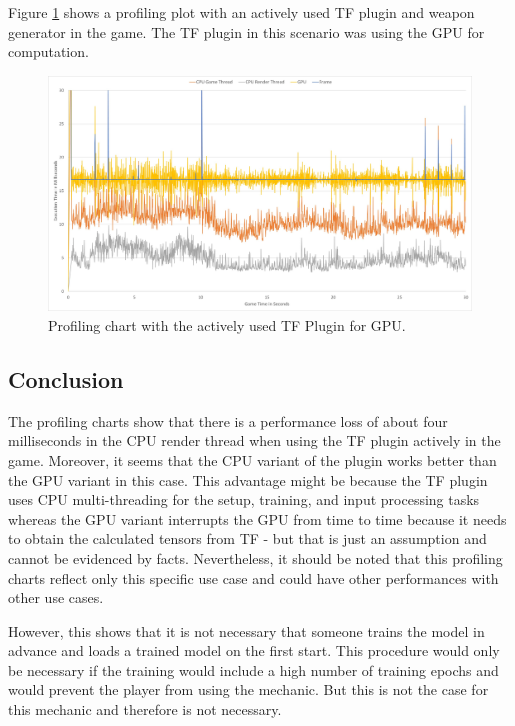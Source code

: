 \documentclass[MGS,Master,english]{twbook}%
\begin{document}
Figure \ref{scenario::profiling_GPU} shows a profiling plot with an actively used \ac{TF} plugin and weapon generator in the game. The \ac{TF} plugin in this scenario was using the \ac{GPU} for computation.
\begin{figure}[!ht]
	\centering
	\includegraphics[width=1.0\linewidth]{PICs/Profiling/tf_gpu}
	\caption{Profiling chart with the actively used \ac{TF} Plugin for \ac{GPU}.} \label{scenario::profiling_GPU}
\end{figure}

\subsection{Conclusion}
The profiling charts show that there is a performance loss of about four milliseconds in the \ac{CPU} render thread when using the \ac{TF} plugin actively in the game. Moreover, it seems that the \ac{CPU} variant of the plugin works better than the \ac{GPU} variant in this case. This advantage might be because the \ac{TF} plugin uses \ac{CPU} multi-threading for the setup, training, and input processing tasks whereas the \ac{GPU} variant interrupts the \ac{GPU} from time to time because it needs to obtain the calculated tensors from \ac{TF} - but that is just an assumption and cannot be evidenced by facts. Nevertheless, it should be noted that this profiling charts reflect only this specific use case and could have other performances with other use cases. 

However, this shows that it is not necessary that someone trains the model in advance and loads a trained model on the first start. This procedure would only be necessary if the training would include a high number of training epochs and would prevent the player from using the mechanic. But this is not the case for this mechanic and therefore is not necessary.
\end{document}
